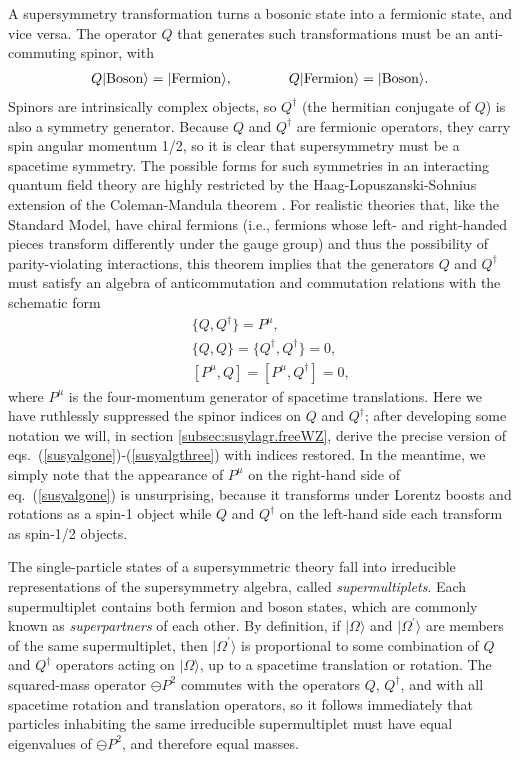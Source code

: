 \documentclass[12pt]{article}
\def\BDpos{}
\def\BDpos{-}
\def\BDpos{\oplus}
\def\BDpos{\ominus}
\newcommand{\dagg}[1]{#1^\dagger}
\def\beq{\begin{eqnarray}}
\def\eeq{\end{eqnarray}}
\begin{document}
A supersymmetry transformation turns a bosonic state into a fermionic
state, and vice versa. The operator $Q$ that generates such
transformations must be an anti-commuting spinor, with
\beq
Q |{\rm Boson}\rangle = |{\rm Fermion }\rangle, \qquad\qquad
Q |{\rm Fermion}\rangle = |{\rm Boson }\rangle .
\eeq
Spinors are intrinsically complex objects, so $Q^\dagger$ (the hermitian
conjugate of $Q$) is also a symmetry generator. Because $Q$ and
$Q^\dagger$ are fermionic operators, they carry spin angular momentum 1/2,
so it is clear that supersymmetry must be a spacetime symmetry. The
possible forms for such symmetries in an interacting quantum field theory
are highly restricted by the Haag-Lopuszanski-Sohnius extension \cite{HLS} of the
Coleman-Mandula theorem \cite{ColemanMandula}. For realistic theories that, like the
Standard Model, have chiral fermions (i.e., fermions whose left- and
right-handed pieces transform differently under the gauge group) and thus
the possibility of parity-violating interactions, this theorem implies
that the generators $Q$ and $Q^\dagger$ must satisfy an algebra of
anticommutation and commutation relations with the schematic form
\beq
&&\{ Q, Q^\dagger \} = P^\mu , \label{susyalgone}
\\
&&\{ Q,Q \} = \{ Q^\dagger , Q^\dagger \} = 0 , \label{susyalgtwo}
\\
&&[ P^\mu , Q  ] = [P^\mu, Q^\dagger ] = 0 ,\label{susyalgthree}
\eeq
where $P^\mu$ is the four-momentum generator of spacetime translations.
Here we have ruthlessly suppressed the spinor indices on $Q$ and
$Q^\dagger$; after developing some notation we will, in section
\ref{subsec:susylagr.freeWZ}, derive the precise version of
eqs.~(\ref{susyalgone})-(\ref{susyalgthree}) with indices restored. In the
meantime, we simply note that the appearance of $P^\mu$ on the right-hand
side of eq.~(\ref{susyalgone}) is unsurprising, because it transforms under
Lorentz boosts and rotations as a spin-1 object while $Q$ and $Q^\dagger$
on the left-hand side each transform as spin-1/2 objects. 

The single-particle states of a supersymmetric theory fall into
irreducible representations of the supersymmetry algebra, called {\it
supermultiplets}. Each supermultiplet contains both fermion and boson
states, which are commonly known as {\it superpartners} of each other. By
definition, if $|\Omega\rangle$ and $|\Omega^\prime \rangle$ are members
of the same supermultiplet, then $|\Omega^\prime\rangle$ is proportional
to some combination of $Q$ and $\dagg{Q}$ operators acting on
$|\Omega\rangle $, up to a spacetime translation or rotation. The
squared-mass operator $\BDpos P^2$ commutes with the operators $Q$,
$\dagg{Q}$, and with all spacetime rotation and translation operators, so
it follows immediately that particles inhabiting the same irreducible
supermultiplet must have equal eigenvalues of $\BDpos P^2$, and therefore
equal masses. 
\end{document}
